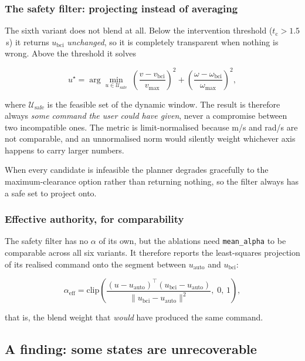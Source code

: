 \documentclass[11pt,a4paper]{article}
\newcommand{\ubci}{u_{\mathrm{bci}}}
\newcommand{\uauto}{u_{\mathrm{auto}}}
\newcommand{\ttc}{t_{\mathrm{c}}}
\theoremstyle{plain}
\theoremstyle{definition}
\begin{document}
\subsubsection*{The safety filter: projecting instead of averaging}

The sixth variant does not blend at all. Below the intervention
threshold ($\ttc > 1.5$\,s) it returns $\ubci$ \emph{unchanged}, so it is
completely transparent when nothing is wrong. Above the threshold it
solves

\begin{equation}
u^{\star} = \arg\min_{u \in \mathcal{U}_{\mathrm{safe}}}
\;\left(\frac{v - v_{\mathrm{bci}}}{v_{\max}}\right)^{2}
+ \left(\frac{\omega - \omega_{\mathrm{bci}}}{\omega_{\max}}\right)^{2},
\label{eq:filter}
\end{equation}

where $\mathcal{U}_{\mathrm{safe}}$ is the feasible set of the dynamic
window. The result is therefore always \emph{some command the user could
have given}, never a compromise between two incompatible ones. The
metric is limit-normalised because m/s and rad/s are not comparable, and
an unnormalised norm would silently weight whichever axis happens to
carry larger numbers.

When every candidate is infeasible the planner degrades gracefully to
the maximum-clearance option rather than returning nothing, so the
filter always has a safe set to project onto.

\subsubsection*{Effective authority, for comparability}

The safety filter has no $\alpha$ of its own, but the ablations need
\texttt{mean\_alpha} to be comparable across all six variants. It
therefore reports the least-squares projection of its realised command
onto the segment between $\uauto$ and $\ubci$:

\begin{equation}
\alpha_{\mathrm{eff}} = \mathrm{clip}\!\left(
\frac{(u - \uauto)^{\!\top}(\ubci - \uauto)}
     {\lVert \ubci - \uauto\rVert^2}, \; 0,\, 1\right),
\label{eq:alphaeff}
\end{equation}

that is, the blend weight that \emph{would} have produced the same
command.

\subsection{A finding: some states are unrecoverable}
\label{sec:unrecoverable}
\end{document}
